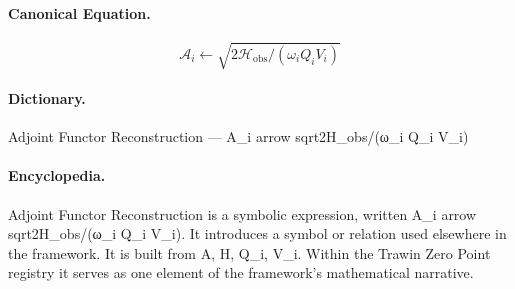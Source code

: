\paragraph{Canonical Equation.}
\[
\mathcal{A}_i \leftarrow \sqrt{2\mathcal{H}_{\text{obs}}/(\omega_i Q_i V_i)}
\]

\paragraph{Dictionary.}
Adjoint Functor Reconstruction — A\_i arrow sqrt2H\_obs/(ω\_i Q\_i V\_i)

\paragraph{Encyclopedia.}
Adjoint Functor Reconstruction is a symbolic expression, written A\_i arrow sqrt2H\_obs/(ω\_i Q\_i V\_i). It introduces a symbol or relation used elsewhere in the framework. It is built from A, H, Q\_i, V\_i. Within the Trawin Zero Point registry it serves as one element of the framework's mathematical narrative.
